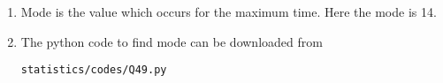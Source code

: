 \renewcommand{\theequation}{\theenumi}
\begin{enumerate}[label=\thesection.\arabic*.,ref=\thesection.\theenumi]
\item Mode is the value which occurs for the maximum time. Here the mode is 14.
\item The python code to find mode can be downloaded from
\begin{lstlisting}
statistics/codes/Q49.py
\end{lstlisting}
\end{enumerate}